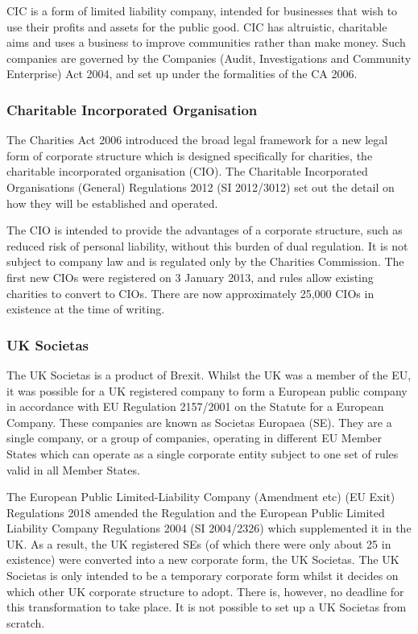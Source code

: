 \documentclass[
]{article}
\begin{document}
CIC is a form of limited liability company, intended for businesses that
wish to use their profits and assets for the public good. CIC has
altruistic, charitable aims and uses a business to improve communities
rather than make money. Such companies are governed by the Companies
(Audit, Investigations and Community Enterprise) Act 2004, and set up
under the formalities of the CA 2006.

\hypertarget{charitable-incorporated-organisation}{%
\subsubsection{Charitable Incorporated
Organisation}\label{charitable-incorporated-organisation}}

The Charities Act 2006 introduced the broad legal framework for a new
legal form of corporate structure which is designed specifically for
charities, the charitable incorporated organisation (CIO). The
Charitable Incorporated Organisations (General) Regulations 2012 (SI
2012/3012) set out the detail on how they will be established and
operated.

The CIO is intended to provide the advantages of a corporate structure,
such as reduced risk of personal liability, without this burden of dual
regulation. It is not subject to company law and is regulated only by
the Charities Commission. The first new CIOs were registered on 3
January 2013, and rules allow existing charities to convert to CIOs.
There are now approximately 25,000 CIOs in existence at the time of
writing.

\hypertarget{uk-societas}{%
\subsubsection{UK Societas}\label{uk-societas}}

The UK Societas is a product of Brexit. Whilst the UK was a member of
the EU, it was possible for a UK registered company to form a European
public company in accordance with EU Regulation 2157/2001 on the Statute
for a European Company. These companies are known as Societas Europaea
(SE). They are a single company, or a group of companies, operating in
different EU Member States which can operate as a single corporate
entity subject to one set of rules valid in all Member States.

The European Public Limited-Liability Company (Amendment etc) (EU Exit)
Regulations 2018 amended the Regulation and the European Public Limited
Liability Company Regulations 2004 (SI 2004/2326) which supplemented it
in the UK. As a result, the UK registered SEs (of which there were only
about 25 in existence) were converted into a new corporate form, the UK
Societas. The UK Societas is only intended to be a temporary corporate
form whilst it decides on which other UK corporate structure to adopt.
There is, however, no deadline for this transformation to take place. It
is not possible to set up a UK Societas from scratch.
\end{document}
